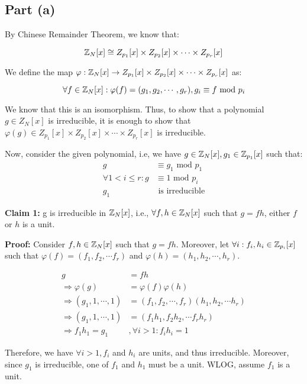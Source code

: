 \subsection{Part (a)}
By Chinese Remainder Theorem, we know that:

\[
\mathbb{Z}_N[x] \cong Z_{p_1}[x] \times Z_{p_2}[x] \times \cdots \times Z_{p_r}[x]
\]

We define the map $\varphi: \mathbb{Z}_N[x] \rightarrow Z_{p_1}[x] \times Z_{p_2}[x] \times \cdots \times Z_{p_r}[x]$ as:

\[
\forall f \in \mathbb{Z}_N[x]: \varphi(f) = (g_1, g_2, \cdots, g_r), g_i \equiv f \text{ mod } p_i
\]

We know that this is an isomorphism. Thus, to show that a polynomial $g \in Z_N[x]$ is irreducible, it is enough to show that $\varphi(g) \in Z_{p_1}[x] \times Z_{p_2}[x] \times \cdots \times Z_{p_r}[x]$ is irreducible.

Now, consider the given polynomial, i.e, we have $g \in \mathbb{Z}_N[x], g_1 \in \mathbb{Z}_{p_1}[x]$ such that: 
\begin{align*}
    g &\equiv g_1 \text{ mod } p_1 \\
    \forall 1 < i \le r:  g &\equiv 1 \text{ mod } p_i \\
    g_1 &\text{ is irreducible} 
\end{align*}

\textbf{Claim 1: } g is irreducible in $\mathbb{Z}_N[x]$, i.e., $\forall f, h \in \mathbb{Z}_N[x]$ such that $g = fh$, either $f$ or $h$ is a unit.

\textbf{Proof: } Consider $f, h \in \mathbb{Z}_N[x]$ such that $g = fh$. Moreover, let $\forall i: f_i, h_i \in \mathbb{Z}_{p_i}[x]$ such that $\varphi(f) = (f_1, f_2, \cdots f_r)$ and $ \varphi(h) = (h_1, h_2, \cdots, h_r)$.

\begin{align*}
    g &= fh \\
    \Rightarrow \varphi(g) &= \varphi(f) \varphi(h) \\
    \Rightarrow (g_1, 1, \cdots, 1) &= (f_1, f_2, \cdots, f_r) (h_1, h_2, \cdots h_r) \\
    \Rightarrow (g_1, 1, \cdots, 1) &= (f_1 h_1, f_2 h_2, \cdots f_r h_r) \\
    \Rightarrow f_1 h_1 = g_1&, \forall i > 1: f_i h_i = 1
\end{align*}

Therefore, we have $\forall i > 1, f_i$ and $h_i$ are units, and thus irreducible. Moreover, since $g_1$ is irreducible, one of $f_1$ and $h_1$ must be a unit. WLOG, assume $f_1$ is a unit.

